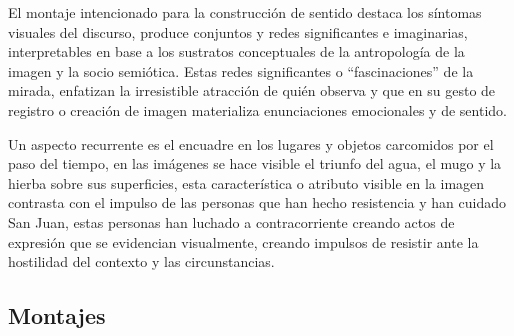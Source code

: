 El montaje intencionado para la construcción de sentido destaca los síntomas visuales del discurso, produce conjuntos y redes significantes e imaginarias, interpretables en base a los sustratos conceptuales de la antropología de la imagen y la socio semiótica. Estas redes significantes o “fascinaciones” de la mirada, enfatizan la irresistible atracción de quién observa y que en su gesto de registro o creación de imagen materializa enunciaciones emocionales y de sentido.

Un aspecto recurrente es el encuadre en los lugares y objetos carcomidos por el paso del tiempo, en las imágenes se hace visible el triunfo del agua, el mugo y la hierba sobre sus superficies, esta característica o atributo visible en la imagen contrasta con el impulso de las personas que han hecho resistencia y han cuidado San Juan, estas personas han luchado a contracorriente creando actos de expresión que se evidencian visualmente, creando impulsos de resistir ante la hostilidad del contexto y las circunstancias.

\subsection{Montajes}